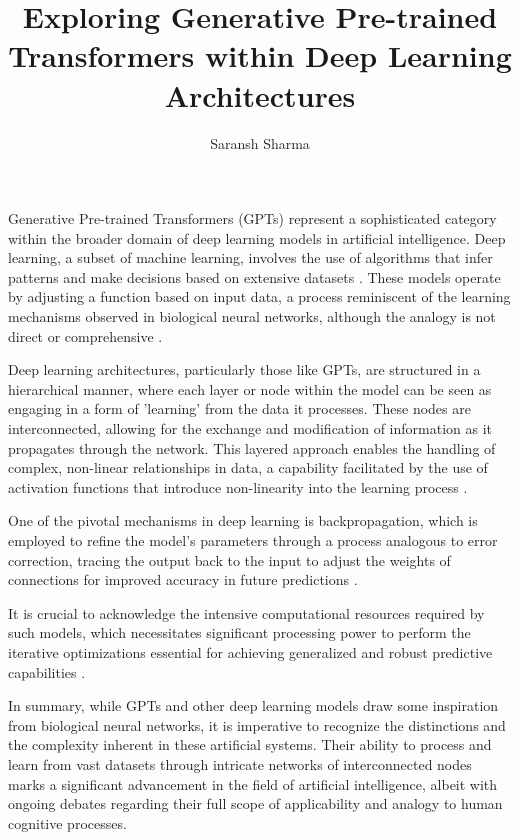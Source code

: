 \documentclass{article}
\begin{document}
\title{Exploring Generative Pre-trained Transformers within Deep Learning Architectures }
\author{Saransh Sharma}
\date{}

\maketitle

Generative Pre-trained Transformers (GPTs) represent a sophisticated category within the broader domain of deep learning models in artificial intelligence. Deep learning, a subset of machine learning, involves the use of algorithms that infer patterns and make decisions based on extensive datasets \citep{lecun2015deep}. These models operate by adjusting a function based on input data, a process reminiscent of the learning mechanisms observed in biological neural networks, although the analogy is not direct or comprehensive \citep{schmidhuber2015deep}.

Deep learning architectures, particularly those like GPTs, are structured in a hierarchical manner, where each layer or node within the model can be seen as engaging in a form of 'learning' from the data it processes. These nodes are interconnected, allowing for the exchange and modification of information as it propagates through the network. This layered approach enables the handling of complex, non-linear relationships in data, a capability facilitated by the use of activation functions that introduce non-linearity into the learning process \citep{goodfellow2016deep}.

One of the pivotal mechanisms in deep learning is backpropagation, which is employed to refine the model's parameters through a process analogous to error correction, tracing the output back to the input to adjust the weights of connections for improved accuracy in future predictions \citep{rumelhart1986learning}.

It is crucial to acknowledge the intensive computational resources required by such models, which necessitates significant processing power to perform the iterative optimizations essential for achieving generalized and robust predictive capabilities \citep{strubell2019energy}.

In summary, while GPTs and other deep learning models draw some inspiration from biological neural networks, it is imperative to recognize the distinctions and the complexity inherent in these artificial systems. Their ability to process and learn from vast datasets through intricate networks of interconnected nodes marks a significant advancement in the field of artificial intelligence, albeit with ongoing debates regarding their full scope of applicability and analogy to human cognitive processes.
\end{document}
